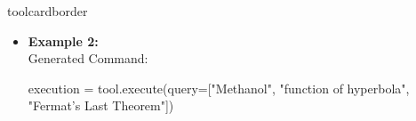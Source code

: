 \begin{custombox}[title=Instruction for {Tool Executor}]{toolcardborder}
\begin{itemize}[left=3pt, label={}, itemsep=0pt, parsep=0pt]
\item \hspace{-3mm}\textbf{Example 2:}\\
Generated Command:
\begin{simplecode}
execution = tool.execute(query=["Methanol", "function of hyperbola", "Fermat's Last Theorem"])
\end{simplecode}
\end{itemize}
\end{custombox}